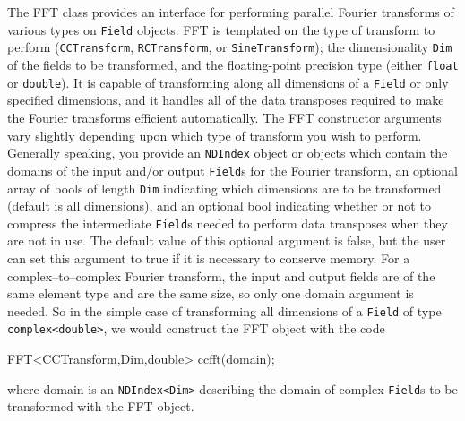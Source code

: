 \chapter{}
\label{sec:fft}

The FFT class provides an interface for performing parallel Fourier transforms of various types on \ippl \texttt{\texttt{Field}} objects. FFT is templated on the type of transform to perform (\texttt{CCTransform}, \texttt{RCTransform}, or \texttt{SineTransform}); the dimensionality \texttt{\texttt{Dim}} of the fields to be transformed, and the floating-point precision type (either \texttt{float} or \texttt{double}). It is capable of transforming along all dimensions of a \texttt{\texttt{Field}} or only specified dimensions, and it handles all of the data transposes required to make the Fourier transforms efficient automatically. The FFT constructor arguments vary slightly depending upon which type of transform you wish to perform. Generally speaking, you provide an {\tt NDIndex} object or objects which contain the domains of the input and/or output \texttt{Field}s for the Fourier transform, an optional array of bools of length \texttt{Dim} indicating which dimensions are to be transformed (default is all dimensions), and an optional bool indicating whether or not to compress the intermediate \texttt{Field}s needed to perform data transposes when they are not in use. The default value of this optional argument is false, but the user can set this argument to true if it is necessary to conserve memory. For a complex--to--complex Fourier transform, the input and output fields are of the same element type and are the same size, so only one domain argument is needed. So in the simple case of transforming all dimensions of a \texttt{Field} of type {\tt complex<double>}, we would construct the FFT object with the code
\begin{smallcode}
FFT<CCTransform,Dim,double> ccfft(domain);
\end{smallcode}
where domain is an {\tt NDIndex<Dim>} describing the domain of complex \texttt{Field}s to be transformed with the FFT object.
